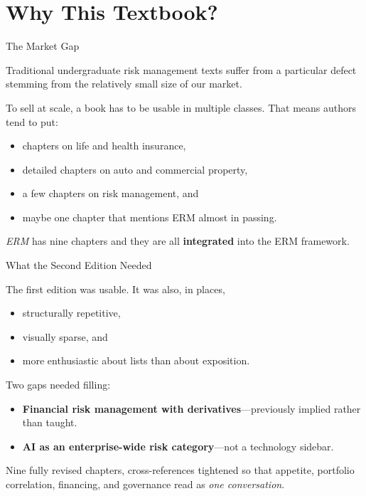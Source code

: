 \documentclass[aspectratio=169]{beamer}
\begin{document}
\section{Why This Textbook?}

\begin{frame}{The Market Gap}

Traditional undergraduate risk management texts suffer from a particular
defect stemming from the relatively small size of our market.

\bigskip
To sell at scale, a book has to be usable in multiple classes. That means
authors tend to put:

\begin{itemize}\setlength\itemsep{0.5em}
  \item chapters on life and health insurance,
  \item detailed chapters on auto and commercial property,
  \item a few chapters on risk management, and
  \item maybe one chapter that mentions ERM almost in passing.
\end{itemize}

\bigskip
\textit{ERM} has nine chapters and they are all \textbf{integrated} into
the ERM framework.

\end{frame}

\begin{frame}{What the Second Edition Needed}

The first edition was usable. It was also, in places,
\begin{itemize}\setlength\itemsep{0.5em}
  \item structurally repetitive,
  \item visually sparse, and
  \item more enthusiastic about lists than about exposition.
\end{itemize}

\bigskip
Two gaps needed filling:
\begin{itemize}\setlength\itemsep{0.5em}
  \item \textbf{Financial risk management with derivatives}---previously
        implied rather than taught.
  \item \textbf{AI as an enterprise-wide risk category}---not a technology
        sidebar.
\end{itemize}

\bigskip
Nine fully revised chapters, cross-references tightened so that appetite,
portfolio correlation, financing, and governance read as \emph{one
conversation}.

\end{frame}
\end{document}
